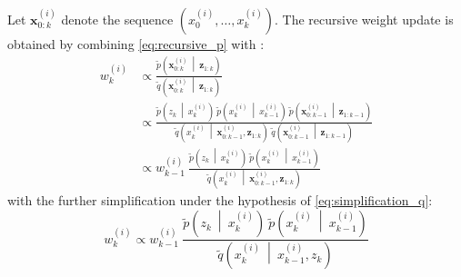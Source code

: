Let $\mathbf{x}_{0:k}^{(i)}$ denote the sequence $\left(x_0^{(i)},\dots,x_k^{(i)}\right)$. The recursive weight update is obtained by combining \eqref{eq:recursive_p} with :
\begin{equation}
	\begin{aligned}
	w_k^{(i)}&\propto\frac{\tilde{p}\left(\mathbf{x}_{0:k}^{(i)}\:\middle|\:\mathbf{z}_{1:k}\right)}{\tilde{q}\left(\mathbf{x}_{0:k}^{(i)}\:\middle|\:\mathbf{z}_{1:k}\right)}\\
	&\propto\frac{\tilde{p}\left(z_k\:\middle|\:x_k^{(i)}\right)\:\tilde{p}\left(x_k^{(i)}\:\middle|\:x_{k-1}^{(i)}\right)\:\tilde{p}\left(\mathbf{x}_{0:k-1}^{(i)}\:\middle|\:\mathbf{z}_{1:k-1}\right)}{\tilde{q}\left(x_k^{(i)}\:\middle|\:\mathbf{x}_{0:k-1}^{(i)},\mathbf{z}_{1:k}\right)\:\tilde{q}\left(\mathbf{x}_{0:k-1}^{(i)}\:\middle|\:\mathbf{z}_{1:k-1}\right)}\\
	&\propto w_{k-1}^{(i)}\:\frac{\tilde{p}\left(z_k\:\middle|\:x_k^{(i)}\right)\:\tilde{p}\left(x_k^{(i)}\:\middle|\:x_{k-1}^{(i)}\right)}{\tilde{q}\left(x_k^{(i)}\:\middle|\:\mathbf{x}_{0:k-1}^{(i)},\mathbf{z}_{1:k}\right)}
	\end{aligned}\label{eq:weight_update}
\end{equation}
with the further simplification under the hypothesis of \eqref{eq:simplification_q}:
\begin{equation}
	w_k^{(i)}\propto w_{k-1}^{(i)}\:\frac{\tilde{p}\left(z_k\:\middle|\:x_k^{(i)}\right)\:\tilde{p}\left(x_k^{(i)}\:\middle|\:x_{k-1}^{(i)}\right)}{\tilde{q}\left(x_k^{(i)}\:\middle|\:x_{k-1}^{(i)},z_k\right)}
\end{equation}

